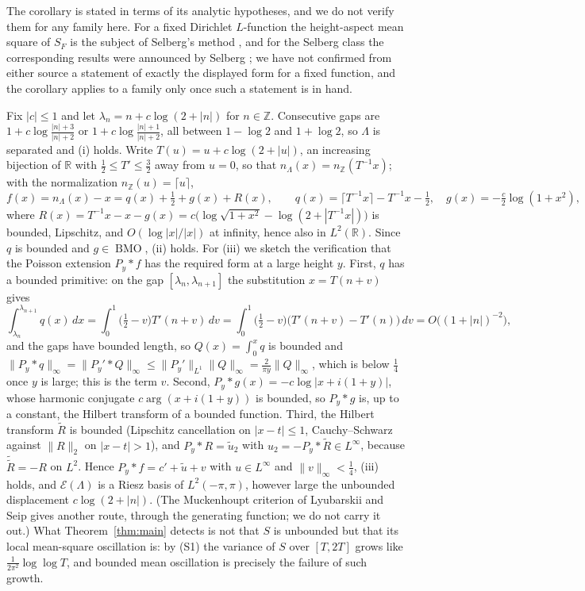 \documentclass[11pt]{article}
\DeclareMathOperator{\BMO}{BMO}
\newcommand{\R}{\mathbb{R}}
\newcommand{\Z}{\mathbb{Z}}
\newcommand{\Lam}{\Lambda}
\newcommand{\E}{\mathcal{E}}
\begin{document}
The corollary is stated in terms of its analytic hypotheses, and we do not verify them for any family here. For a fixed Dirichlet $L$-function the height-aspect mean square of $S_F$ is the subject of Selberg's method \cite{Selberg46b}, and for the Selberg class the corresponding results were announced by Selberg \cite{Selberg92}; we have not confirmed from either source a statement of exactly the displayed form for a fixed function, and the corollary applies to a family only once such a statement is in hand.

\begin{remark}\label{rem:drift}
Fix $|c|\le1$ and let $\lambda_n=n+c\log(2+|n|)$ for $n\in\Z$. Consecutive gaps are $1+c\log\frac{|n|+3}{|n|+2}$ or $1+c\log\frac{|n|+1}{|n|+2}$, all between $1-\log2$ and $1+\log2$, so $\Lam$ is separated and (i) holds. Write $T(u)=u+c\log(2+|u|)$, an increasing bijection of $\R$ with $\frac12\le T'\le\frac32$ away from $u=0$, so that $n_\Lam(x)=n_\Z(T^{-1}x)$; with the normalization $n_\Z(u)=\lceil u\rceil$,
\[
f(x)=n_\Lam(x)-x=q(x)+\tfrac12+g(x)+R(x),\qquad q(x)=\lceil T^{-1}x\rceil-T^{-1}x-\tfrac12,\quad g(x)=-\tfrac c2\log(1+x^2),
\]
where $R(x)=T^{-1}x-x-g(x)=c\bigl(\log\sqrt{1+x^2}-\log(2+|T^{-1}x|)\bigr)$ is bounded, Lipschitz, and $O(\log|x|/|x|)$ at infinity, hence also in $L^2(\R)$. Since $q$ is bounded and $g\in\BMO$, (ii) holds. For (iii) we sketch the verification that the Poisson extension $P_y*f$ has the required form at a large height $y$. First, $q$ has a bounded primitive: on the gap $[\lambda_n,\lambda_{n+1}]$ the substitution $x=T(n+v)$ gives
\[
\int_{\lambda_n}^{\lambda_{n+1}}q(x)\,dx=\int_0^1\bigl(\tfrac12-v\bigr)T'(n+v)\,dv=\int_0^1\bigl(\tfrac12-v\bigr)\bigl(T'(n+v)-T'(n)\bigr)\,dv=O\bigl((1+|n|)^{-2}\bigr),
\]
and the gaps have bounded length, so $Q(x)=\int_0^xq$ is bounded and $\|P_y*q\|_\infty=\|P_y'*Q\|_\infty\le\|P_y'\|_{L^1}\|Q\|_\infty=\frac{2}{\pi y}\|Q\|_\infty$, which is below $\frac14$ once $y$ is large; this is the term $v$. Second, $P_y*g(x)=-c\log|x+i(1+y)|$, whose harmonic conjugate $c\arg(x+i(1+y))$ is bounded, so $P_y*g$ is, up to a constant, the Hilbert transform of a bounded function. Third, the Hilbert transform $\tilde R$ is bounded (Lipschitz cancellation on $|x-t|\le1$, Cauchy--Schwarz against $\|R\|_2$ on $|x-t|>1$), and $P_y*R=\tilde u_2$ with $u_2=-P_y*\tilde R\in L^\infty$, because $\tilde{\tilde R}=-R$ on $L^2$. Hence $P_y*f=c'+\tilde u+v$ with $u\in L^\infty$ and $\|v\|_\infty<\frac14$, (iii) holds, and $\E(\Lam)$ is a Riesz basis of $L^2(-\pi,\pi)$, however large the unbounded displacement $c\log(2+|n|)$. (The Muckenhoupt criterion of Lyubarskii and Seip \cite{LyubarskiiSeip} gives another route, through the generating function; we do not carry it out.) What Theorem~\ref{thm:main} detects is not that $S$ is unbounded but that its local mean-square oscillation is: by (S1) the variance of $S$ over $[T,2T]$ grows like $\frac{1}{2\pi^2}\log\log T$, and bounded mean oscillation is precisely the failure of such growth.
\end{remark}
\end{document}
